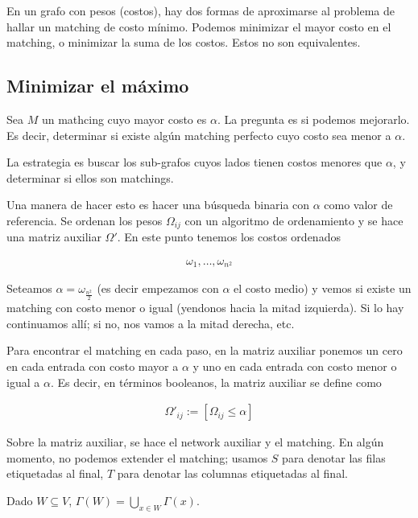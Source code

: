\documentclass[a4paper]{article}
\begin{document}
En un grafo con pesos (costos), hay dos formas de aproximarse al problema de
hallar un matching de costo mínimo. Podemos minimizar el mayor costo en el
matching, o minimizar la suma de los costos. Estos no son equivalentes.

\subsection{Minimizar el máximo}

Sea $M$ un mathcing cuyo mayor costo es $\alpha$. La pregunta es si podemos
mejorarlo. Es decir, determinar si existe algún matching perfecto cuyo costo
sea menor a $\alpha$.

La estrategia es buscar los sub-grafos cuyos lados tienen costos menores que
$\alpha$, y determinar si ellos son matchings. 

Una manera de hacer esto es hacer una búsqueda binaria con $\alpha$ como valor
de referencia. Se ordenan los pesos $\Omega_{ij}$ con un algoritmo de ordenamiento
y se hace una matriz auxiliar $\Omega'$. En este punto tenemos los costos ordenados 

\begin{align*}
    \omega_1, \ldots, \omega_{n^2}
\end{align*}

Seteamos $\alpha = \omega_{\frac{n^2}{2}}$ (es decir empezamos con $\alpha$ el
costo medio) y vemos si existe un matching con costo menor o igual (yendonos
hacia la mitad izquierda). Si lo hay continuamos allí; si no, nos vamos a la
mitad derecha, etc.

Para encontrar el matching en cada paso, en la matriz auxiliar ponemos un cero
en cada entrada con costo mayor a $\alpha$ y uno en cada entrada con costo
menor o igual a $\alpha$. Es decir, en términos booleanos, la matriz auxiliar
se define como

\begin{align*}
    \Omega'_{ij} := \left[ \Omega_{ij} \leq \alpha \right] 
\end{align*}

Sobre la matriz auxiliar, se hace el network auxiliar y el matching. En algún momento,
no podemos extender el matching; usamos $S$ para denotar las filas etiquetadas al final, $T$
para denotar las columnas etiquetadas al final. 

\begin{definition}
    Dado $W \subseteq V$, $\Gamma(W) = \bigcup_{x \in W} \Gamma(x)$.
\end{definition}
\end{document}
